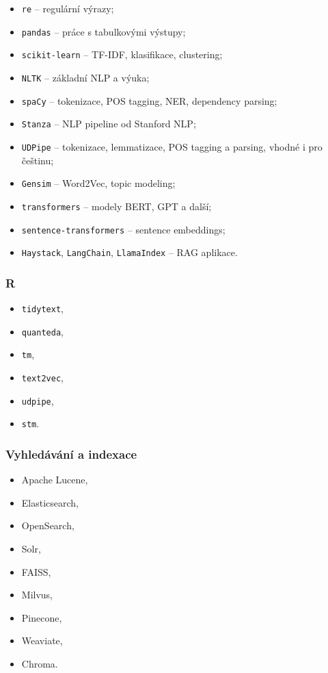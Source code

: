 \begin{itemize}
    \item \texttt{re} -- regulární výrazy;
    \item \texttt{pandas} -- práce s tabulkovými výstupy;
    \item \texttt{scikit-learn} -- TF-IDF, klasifikace, clustering;
    \item \texttt{NLTK} -- základní NLP a výuka;
    \item \texttt{spaCy} -- tokenizace, POS tagging, NER, dependency parsing;
    \item \texttt{Stanza} -- NLP pipeline od Stanford NLP;
    \item \texttt{UDPipe} -- tokenizace, lemmatizace, POS tagging a parsing, vhodné i pro češtinu;
    \item \texttt{Gensim} -- Word2Vec, topic modeling;
    \item \texttt{transformers} -- modely BERT, GPT a další;
    \item \texttt{sentence-transformers} -- sentence embeddings;
    \item \texttt{Haystack}, \texttt{LangChain}, \texttt{LlamaIndex} -- RAG aplikace.
\end{itemize}

\subsubsection{R}

\begin{itemize}
    \item \texttt{tidytext},
    \item \texttt{quanteda},
    \item \texttt{tm},
    \item \texttt{text2vec},
    \item \texttt{udpipe},
    \item \texttt{stm}.
\end{itemize}

\subsubsection{Vyhledávání a indexace}

\begin{itemize}
    \item Apache Lucene,
    \item Elasticsearch,
    \item OpenSearch,
    \item Solr,
    \item FAISS,
    \item Milvus,
    \item Pinecone,
    \item Weaviate,
    \item Chroma.
\end{itemize}

